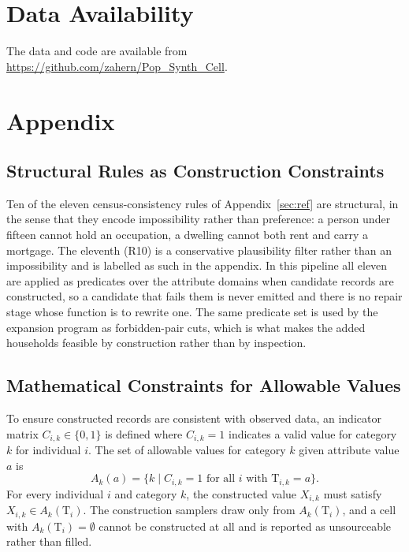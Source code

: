 \documentclass[review]{elsarticle}
\begin{document}
\section{Data Availability}
The data and code are available from \url{https://github.com/zahern/Pop_Synth_Cell}.

\newpage
\section*{Appendix}
\setcounter{section}{1}
\renewcommand{\thesection}{\Alph{section}}
\renewcommand{\thesubsection}{\thesection.\arabic{subsection}}

\subsection{Structural Rules as Construction Constraints}
\label{sec:consistency}
Ten of the eleven census-consistency rules of Appendix~\ref{sec:ref} are structural, in the sense that they encode impossibility rather than preference: a person under fifteen cannot hold an occupation, a dwelling cannot both rent and carry a mortgage. The eleventh (R10) is a conservative plausibility filter rather than an impossibility and is labelled as such in the appendix. In this pipeline all eleven are applied as predicates over the attribute domains when candidate records are constructed, so a candidate that fails them is never emitted and there is no repair stage whose function is to rewrite one. The same predicate set is used by the expansion program as forbidden-pair cuts, which is what makes the added households feasible by construction rather than by inspection.



\subsection{Mathematical Constraints for Allowable Values}
\label{sec:mathconstraints}
To ensure constructed records are consistent with observed data, an indicator matrix \( C_{i,k}\in\{0,1\} \) is defined where \( C_{i,k}=1 \) indicates a valid value for category \( k \) for individual \( i \). The set of allowable values for category \( k \) given attribute value \( a \) is
\[
A_k(a) = \{ k \mid C_{i,k}=1 \text{ for all } i \text{ with } \text{T}_{i,k}=a \}.
\]
For every individual \( i \) and category \( k \), the constructed value \( X_{i,k} \) must satisfy \( X_{i,k}\in A_k(\text{T}_i) \). The construction samplers draw only from \( A_k(\text{T}_i) \), and a cell with \( A_k(\text{T}_i)=\emptyset \) cannot be constructed at all and is reported as unsourceable rather than filled.
\end{document}
